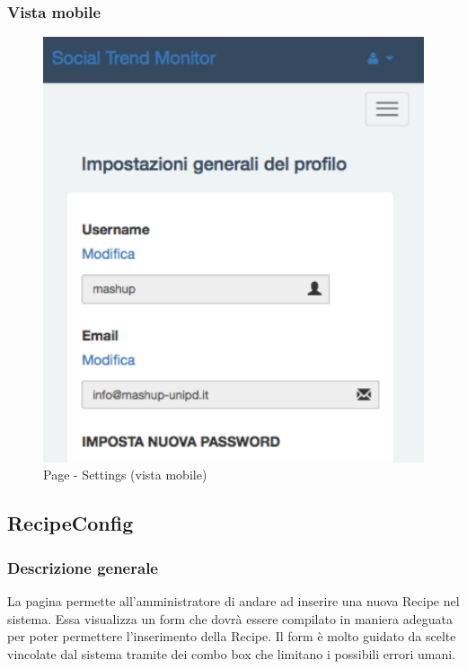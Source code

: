 		\subsubsection{Vista mobile} %
		\begin{figure}[!h]
			\centering
			\centerline{\includegraphics[scale=0.5]{./images/mockup/settings_vm.pdf}}
			\caption{Page - Settings (vista mobile)}
		\end{figure}

\clearpage

	\subsection{RecipeConfig} %
	\label{sub:recipeconfig}
		\subsubsection{Descrizione generale} %
		La pagina permette all'amministratore di andare ad inserire una nuova Recipe nel sistema. Essa visualizza un form che dovrà essere compilato in maniera adeguata per poter permettere l'inserimento della Recipe. Il form è molto guidato da scelte vincolate dal sistema tramite dei combo box che limitano i possibili errori umani. 

